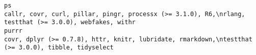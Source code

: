 \documentclass[
  letterpaper,
  DIV=11,
  numbers=noendperiod]{scrreprt}
\begin{document}
\begin{verbatim}
ps                                                                                                                                                                                                                                                                                                                                                                                                                                                                                                                                                                                                                                                                                                                                                                                                                                                                                                                                                                                                                                                                                                                                                                                                    callr, covr, curl, pillar, pingr, processx (>= 3.1.0), R6,\nrlang, testthat (>= 3.0.0), webfakes, withr
purrr                                                                                                                                                                                                                                                                                                                                                                                                                                                                                                                                                                                                                                                                                                                                                                                                                                                                                                                                                                                                                                                                                                                                                                                                     covr, dplyr (>= 0.7.8), httr, knitr, lubridate, rmarkdown,\ntestthat (>= 3.0.0), tibble, tidyselect

\end{verbatim}
\end{document}
